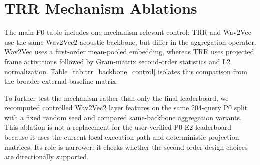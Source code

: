 \documentclass{article}
\begin{document}
\section{TRR Mechanism Ablations}

The main P0 table includes one mechanism-relevant control: TRR and Wav2Vec use the same Wav2Vec2 acoustic backbone, but differ in the aggregation operator. Wav2Vec uses a first-order mean-pooled embedding, whereas TRR uses projected frame activations followed by Gram-matrix second-order statistics and L2 normalization. Table~\ref{tab:trr_backbone_control} isolates this comparison from the broader external-baseline matrix.

\begin{table}[htbp]
	\centering
	\caption{Backbone-controlled diagnostic from P0 Protocol-A. TRR and Wav2Vec share the Wav2Vec2 backbone but use different aggregation operators.}
	\label{tab:trr_backbone_control}
	\small
\end{table}

To further test the mechanism rather than only the final leaderboard, we recomputed controlled Wav2Vec2 layer features on the same 204-query P0 split with a fixed random seed and compared same-backbone aggregation variants. This ablation is not a replacement for the user-verified P0 E2 leaderboard because it uses the current local execution path and deterministic projection matrices. Its role is narrower: it checks whether the second-order design choices are directionally supported.
\end{document}
